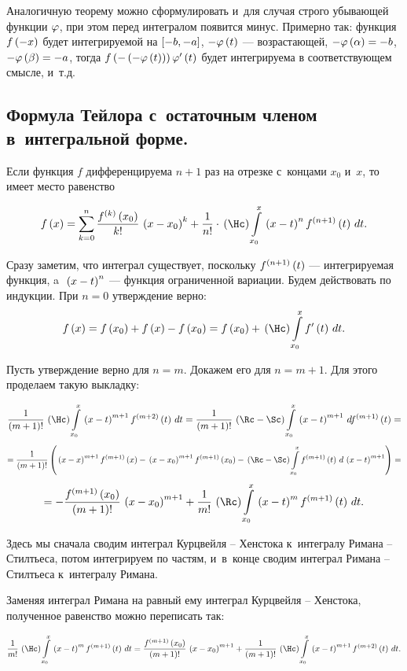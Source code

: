 \documentclass[draft]{article}
\begin{document}
{\small \rem

Аналогичную теорему можно сформулировать и~для случая строго
убывающей функции $\varphi$, при этом перед интегралом появится минус.
Примерно так: функция $f\at(-x)$ будет интегрируемой на
$\seg[-b,-a]$, $-\ph\at(t)$
--- возрастающей, $-\ph\at(\alpha)=-b$, $-\ph\at(\beta)=-a$, тогда
$f\at({-\at({-\ph\at(t)})})\ph'\at(t)$ будет интегрируема в
соответствующем смысле, и~т.д.}

\eject

\subsection{Формула Тейлора с~остаточным членом в~интегральной форме.}


Если функция $f$ дифференцируема $n+1$ раз на отрезке с~концами
$x_0$ и~$x$, то имеет место равенство

$$f\atx=\sum_{k=0}^n{f^{(k)}\at(x_0)\over k!}\,\at(x-x_0)^k+
{1\over n!}\cdot\kurzh\intd[x_0,x]\,\at(x-t)^nf^{(n+1)}\at(t),t.$$

\pr

Сразу заметим, что интеграл существует, поскольку $f^{(n+1)}\at(t)$
--- интегрируемая функция, a~$\,\at(x-t)^n$ --- функция ограниченной вариации.
Будем действовать по индукции. При $n=0$ утверждение верно:
$$f\atx=f\at(x_0)+f\at(x)-f\at(x_0)=f\at(x_0)+\kurzh\intd[x_0,x]f'\at(t),t.$$

Пусть утверждение верно для $n=m$. Докажем его для $n=m+1$. Для
этого проделаем такую выкладку:

$${1\over(m+1)!}\kurzh\intd[x_0,x]\,\at(x-t)^{m+1}f^{(m+2)}\at(t),t=
{1\over(m+1)!}\rimanst\intd[x_0,x]\,\at(x-t)^{m+1},f^{(m+1)}\at(t)=$$
$$={1\over(m+1)!}\at({\,\at(x-x)^{m+1}f^{(m+1)}\at(x)-\,\at(x-x_0)^{m+1}f^{(m+1)}\at(x_0)-
\rimanst\intd[x_0,x]f^{(m+1)}\at(t),\,\at(x-t)^{m+1}})=$$
$$=-{f^{(m+1)}\at(x_0)\over(m+1)!}\,\at(x-x_0)^{m+1}+{1\over m!}\riman\intd[x_0,x]\,\at(x-t)^mf^{(m+1)}\at(t),t.$$

Здесь мы сначала сводим интеграл Курцвейля -- Хенстока к~интегралу
Римана -- Стилтьеса, потом интегрируем по частям, и~в~конце сводим
интеграл Римана -- Стилтьеса к~интегралу Римана.

\smallskip

Заменяя интеграл Римана на равный ему интеграл Курцвейля --
Хенстока, полученное равенство можно переписать так:

$${1\over m!}\kurzh\intd[x_0,x]\,\at(x-t)^mf^{(m+1)}\at(t),t=
{f^{(m+1)}\at(x_0)\over(m+1)!}\,\at(x-x_0)^{m+1}+
{1\over(m+1)!}\kurzh\intd[x_0,x]\,\at(x-t)^{m+1}f^{(m+2)}\at(t),t.$$
\end{document}
